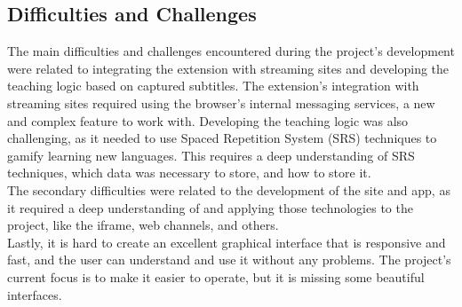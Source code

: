 \documentclass[12pt]{article}
\begin{document}
\subsection{Difficulties and Challenges}
The main difficulties and challenges encountered during the project's development were related to integrating the extension with streaming sites and developing the teaching logic based on captured subtitles. The extension's integration with streaming sites required using the browser's internal messaging services, a new and complex feature to work with. Developing the teaching logic was also challenging, as it needed to use Spaced Repetition System (SRS) techniques to gamify learning new languages. This requires a deep understanding of SRS techniques, which data was necessary to store, and how to store it. \\
The secondary difficulties were related to the development of the site and app, as it required a deep understanding of and applying those technologies to the project, like the iframe, web channels, and others. \\
Lastly, it is hard to create an excellent graphical interface that is responsive and fast, and the user can understand and use it without any problems. The project's current focus is to make it easier to operate, but it is missing some beautiful interfaces. 
\end{document}
